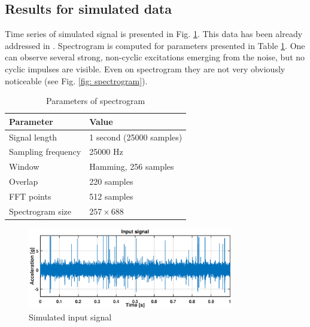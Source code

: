 \documentclass[preprint,12pt]{elsarticle}
\begin{document}
\subsection{Results for simulated data}

Time series of simulated  signal is presented in Fig. \ref{fig: input}. This data has been already addressed in \cite{wylomanskaimpulsive}. Spectrogram is computed for parameters presented in Table \ref{tab:tab1}. One can observe several strong, non-cyclic excitations emerging from the noise, but no cyclic impulses are visible. Even on spectrogram they are not very obviously noticeable (see Fig. \ref{fig: spectrogram}).
\begin{table}[ht!]
    \centering
    \caption{Parameters of spectrogram}
  \begin{tabular}{|l|l|}
    \hline
    \textbf{Parameter} & \textbf{Value} \\ \hline
         Signal length & 1 second (25000 samples) \\ \hline
         Sampling frequency & 25000 Hz \\ \hline
         Window & Hamming, 256 samples \\ \hline
         Overlap & 220 samples \\ \hline
         FFT points & 512 samples \\ \hline
         Spectrogram size &  $257 \times 688$\\
         
    \hline
    \end{tabular}
    \label{tab:tab1}
\end{table}

\begin{figure}[!ht]
\centering
\includegraphics[width = 0.8\textwidth]{figs3/input_sig.eps}
\caption{Simulated input signal}
\label{fig: input}
\end{figure}
\end{document}
